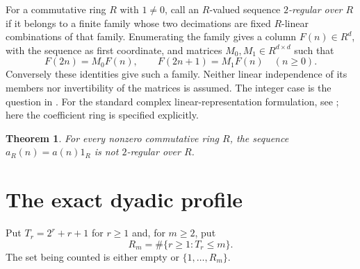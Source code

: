 \documentclass[11pt]{article}
\newtheorem{theorem}{Theorem}
\begin{document}
For a commutative ring $R$ with $1\ne0$, call an $R$-valued sequence
\emph{$2$-regular over $R$} if it belongs to a finite family whose two
decimations are fixed $R$-linear combinations of that family. Enumerating
the family gives a column $F(n)\in R^d$, with the sequence as first
coordinate, and matrices $M_0,M_1\in R^{d\times d}$ such that
\begin{equation}\label{eq:family}
 F(2n)=M_0F(n),\qquad F(2n+1)=M_1F(n)\quad(n\ge0).
\end{equation}
Conversely these identities give such a family. Neither linear
independence of its members nor invertibility of the matrices is assumed.
The integer case is the question in \cite{alekseyev}. For the standard
complex linear-representation formulation, see
\cite[Definition~1, p.~24:3]{heuberger}; here the coefficient ring is
specified explicitly.

\begin{theorem}\label{thm:main}
For every nonzero commutative ring $R$, the sequence
$a_R(n)=a(n)1_R$ is not $2$-regular over $R$.
\end{theorem}

\section{The exact dyadic profile}
Put $T_r=2^r+r+1$ for $r\ge1$ and, for $m\ge2$, put
\[
 R_m=\#\{r\ge1:T_r\le m\}.
\]
The set being counted is either empty or $\{1,\ldots,R_m\}$.
\end{document}
